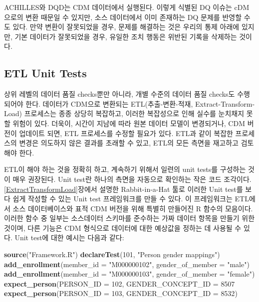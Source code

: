 \documentclass[11pt]{book}
\newenvironment{Shaded}{\begin{snugshade}}{\end{snugshade}}
\newcommand{\KeywordTok}[1]{\textcolor[rgb]{0.13,0.29,0.53}{\textbf{#1}}}
\newcommand{\DataTypeTok}[1]{\textcolor[rgb]{0.13,0.29,0.53}{#1}}
\newcommand{\DecValTok}[1]{\textcolor[rgb]{0.00,0.00,0.81}{#1}}
\newcommand{\StringTok}[1]{\textcolor[rgb]{0.31,0.60,0.02}{#1}}
\newcommand{\NormalTok}[1]{#1}
\theoremstyle{definition}
\theoremstyle{definition}
\theoremstyle{definition}
\theoremstyle{remark}
\let\BeginKnitrBlock\begin \let\EndKnitrBlock\end
\begin{document}
\BeginKnitrBlock{rmdimportant}
ACHILLES와 DQD는 CDM 데이터에서 실행된다. 이렇게 식별된 DQ 이슈는
cDM으로의 변환 때문일 수 있지만, 소스 데이터에서 이미 존재하는 DQ 문제를
반영할 수도 있다. 만약 변환이 잘못되었을 경우, 문제를 해결하는 것은
우리의 통제 아래에 있지만, 기본 데이터가 잘못되었을 경우, 유일한 조치
행동은 위반된 기록을 삭제하는 것이다.
\EndKnitrBlock{rmdimportant}

\subsection{ETL Unit Tests}\label{etlUnitTests}


상위 레벨의 데이터 품질 checks뿐만 아니라, 개별 수준의 데이터 품질
checks도 수행되어야 한다. 데이터가 CDM으로 변환되는 ETL(추출-변환-적재,
Extract-Transform-Load) 프로세스는 종종 상당히 복잡하고, 이러한
복잡성으로 인해 실수를 눈치채지 못할 위험이 있다. 더욱이, 시간이 지남에
따라 원본 데이터 모델이 변경되거나, CDM 버전이 업데이트 되면, ETL
프로세스를 수정할 필요가 있다. ETL과 같이 복잡한 프로세스의 변경은
의도하지 않은 결과를 초래할 수 있고, ETL의 모든 측면을 재고하고 검토해야
한다.

ETL이 해야 하는 것을 정확히 하고, 계속하기 위해서 일련의 unit tests를
구성하는 것이 매우 권장된다. Unit test란 하나의 측면을 자동으로 확인하는
작은 코드 조각이다. \ref{ExtractTransformLoad}장에서 설명한
Rabbit-in-a-Hat 툴로 이러한 Unit test를 보다 쉽게 작성할 수 있는 Unit
test 프레임워크를 만들 수 있다. 이 프레임워크는 ETL에서 소스
데이터베이스와 표적 CDM 버전을 위해 특별히 만들어진 R 함수의 모음이다.
이러한 함수 중 일부는 소스데이터 스키마를 준수하는 가짜 데이터 항목을
만들기 위한 것이며, 다른 기능은 CDM 형식으로 데이터에 대한 예상값을
정하는 데 사용될 수 있다. Unit test에 대한 예시는 다음과 같다:

\begin{Shaded}
\begin{Highlighting}[]
\KeywordTok{source}\NormalTok{(}\StringTok{"Framework.R"}\NormalTok{)}
\KeywordTok{declareTest}\NormalTok{(}\DecValTok{101}\NormalTok{, }\StringTok{"Person gender mappings"}\NormalTok{)}
\KeywordTok{add_enrollment}\NormalTok{(}\DataTypeTok{member_id =} \StringTok{"M000000102"}\NormalTok{, }\DataTypeTok{gender_of_member =} \StringTok{"male"}\NormalTok{)}
\KeywordTok{add_enrollment}\NormalTok{(}\DataTypeTok{member_id =} \StringTok{"M000000103"}\NormalTok{, }\DataTypeTok{gender_of_member =} \StringTok{"female"}\NormalTok{)}
\KeywordTok{expect_person}\NormalTok{(}\DataTypeTok{PERSON_ID =} \DecValTok{102}\NormalTok{, }\DataTypeTok{GENDER_CONCEPT_ID =} \DecValTok{8507}
\KeywordTok{expect_person}\NormalTok{(}\DataTypeTok{PERSON_ID =} \DecValTok{103}\NormalTok{, }\DataTypeTok{GENDER_CONCEPT_ID =} \DecValTok{8532}\NormalTok{)}
\end{Highlighting}
\end{Shaded}
\end{document}
